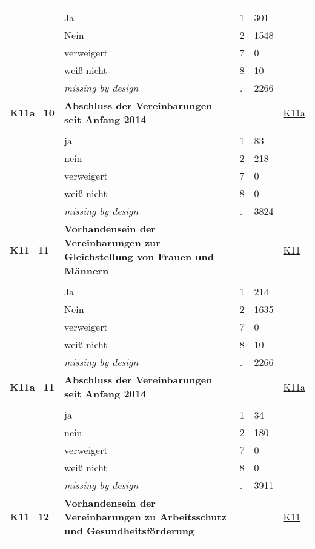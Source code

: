\begin{longtable}{| L{2.65cm} | L{8cm} | C{1.5cm} | R{1.25cm} | C{2.25cm}  |}
   &  &  &  &  \\ 
   & Ja & 1 & 301 &  \\ 
   & Nein & 2 & 1548 &  \\ 
   & verweigert & 7 & 0 &  \\ 
   & weiß nicht & 8 & 10 &  \\ 
   & \textit{missing by design} & \textit{.} & 2266 &  \\ 
   \midrule
\textbf{K11a\_10}\label{var:K11a:10} & \textbf{Abschluss der Vereinbarungen seit Anfang 2014} &  &  & \hyperref[K11a]{K11a} \\ 
   &  &  &  &  \\ 
   & ja & 1 & 83 &  \\ 
   & nein & 2 & 218 &  \\ 
   & verweigert & 7 & 0 &  \\ 
   & weiß nicht & 8 & 0 &  \\ 
   & \textit{missing by design} & \textit{.} & 3824 &  \\ 
   \midrule
\textbf{K11\_11}\label{var:K11:11} & \textbf{Vorhandensein der Vereinbarungen zur Gleichstellung von Frauen und Männern} &  &  & \hyperref[K11]{K11} \\ 
   &  &  &  &  \\ 
   & Ja & 1 & 214 &  \\ 
   & Nein & 2 & 1635 &  \\ 
   & verweigert & 7 & 0 &  \\ 
   & weiß nicht & 8 & 10 &  \\ 
   & \textit{missing by design} & \textit{.} & 2266 &  \\ 
   \midrule
\textbf{K11a\_11}\label{var:K11a:11} & \textbf{Abschluss der Vereinbarungen seit Anfang 2014} &  &  & \hyperref[K11a]{K11a} \\ 
   &  &  &  &  \\ 
   & ja & 1 & 34 &  \\ 
   & nein & 2 & 180 &  \\ 
   & verweigert & 7 & 0 &  \\ 
   & weiß nicht & 8 & 0 &  \\ 
   & \textit{missing by design} & \textit{.} & 3911 &  \\ 
   \midrule
\textbf{K11\_12}\label{var:K11:12} & \textbf{Vorhandensein der Vereinbarungen zu Arbeitsschutz und Gesundheitsförderung} &  &  & \hyperref[K11]{K11} \\ 
   &  &  &  &  \\ 

\end{longtable}
